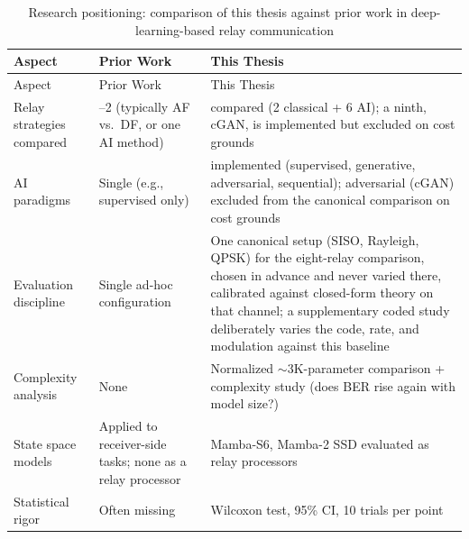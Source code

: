 \begin{longtable}[]{@{}
  >{\raggedright\arraybackslash}p{}
  >{\raggedright\arraybackslash}p{}
  >{\raggedright\arraybackslash}p{}@{}}
\caption[Research positioning]{Research positioning: comparison of this thesis against prior work in deep-learning-based relay communication}\label{tbl:table17}\tabularnewline
\toprule\noalign{}
\begin{minipage}[b]{\linewidth}\raggedright
Aspect
\end{minipage} & \begin{minipage}[b]{\linewidth}\raggedright
Prior Work
\end{minipage} & \begin{minipage}[b]{\linewidth}\raggedright
This Thesis
\end{minipage} \\
\midrule\noalign{}
\endfirsthead
\toprule\noalign{}
\begin{minipage}[b]{\linewidth}\raggedright
Aspect
\end{minipage} & \begin{minipage}[b]{\linewidth}\raggedright
Prior Work
\end{minipage} & \begin{minipage}[b]{\linewidth}\raggedright
This Thesis
\end{minipage} \\
\midrule\noalign{}
\endhead
\bottomrule\noalign{}
\endlastfoot
Relay strategies compared & 1--2 (typically AF vs.~DF, or one AI method) & 8 compared (2 classical + 6 AI); a ninth, cGAN, is implemented but excluded on cost grounds \\
AI paradigms & Single (e.g., supervised only) & 4 implemented (supervised, generative, adversarial, sequential); adversarial (cGAN) excluded from the canonical comparison on cost grounds \\
Evaluation discipline & Single ad-hoc configuration & One canonical setup (SISO, Rayleigh, QPSK) for the eight-relay comparison, chosen in advance and never varied there, calibrated against closed-form theory on that channel; a supplementary coded study deliberately varies the code, rate, and modulation against this baseline \\
Complexity analysis & None & Normalized $\sim$3K-parameter comparison + complexity study (does BER rise again with model size?) \\
State space models & Applied to receiver-side tasks; none as a relay processor & Mamba-S6, Mamba-2 SSD evaluated as relay processors \\
Statistical rigor & Often missing & Wilcoxon test, 95\% CI, 10 trials per point \\
\end{longtable}

